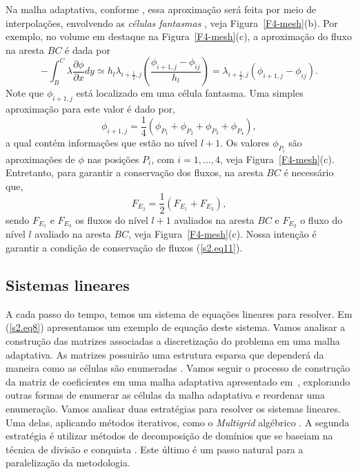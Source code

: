 \documentclass[12pt, brazil]{article}
\begin{document}
Na malha adaptativa, conforme \cite{TRO01}, essa aproximação será feita por meio de interpolações, envolvendo as {\em células fantasmas} \cite{LEV02,TRO01,VER07}, veja Figura~\ref{F4-mesh}(b). Por exemplo, no volume em destaque na Figura~\ref{F4-mesh}(c), a aproximação do fluxo na aresta $BC$ é dada por 
\begin{equation}\label{s2.eq9}
-\int_B^C\lambda\dfrac{\partial\phi}{\partial x}dy \simeq h_l\lambda_{i+\frac{1}{2},j}\left(\dfrac{\phi_{i+1,j}-\phi_{ij}}{h_l}\right)=\lambda_{i+\frac{1}{2},j}(\phi_{i+1,j}-\phi_{ij}).
\end{equation}
Note que $\phi_{i+1,j}$ está localizado em uma célula fantasma. Uma simples aproximação para este valor é dado por,  
\begin{equation}\label{s2.eq10}
\phi_{i+1,j}=\frac{1}{4}(\phi_{P_1}+\phi_{P_2}+\phi_{P_3}+\phi_{P_4}), 
\end{equation}
a qual contém informações que estão no nível $l+1$. Os valores $\phi_{P_i}$ são aproximações de $\phi$ nas posições $P_i$, com $i=1,\ldots,4$, veja Figura~\ref{F4-mesh}(c). Entretanto, para garantir a conservação dos fluxos, na aresta $BC$ é necessário que,
\begin{equation}\label{s2.eq11}
  F_{E_2}=\frac{1}{2}(F_{E_1}+F_{E_3}),
\end{equation}
sendo $F_{E_1}$ e $F_{E_3}$ os fluxos do nível $l+1$ avaliados na aresta $BC$ e $F_{E_2}$ o fluxo do nível $l$ avaliado na aresta $BC$, veja Figura~\ref{F4-mesh}(c). Nossa intenção é garantir a condição de conservação de fluxos (\ref{s2.eq11}).

\subsection{Sistemas lineares}

A cada passo do tempo, temos um sistema de equações lineares para resolver. Em (\ref{s2.eq8}) apresentamos um exemplo de equação deste sistema. Vamos analisar a construção das matrizes associadas a discretização do problema em uma malha adaptativa. As matrizes possuirão uma estrutura esparsa que dependerá da maneira como as células são enumeradas \cite{SAA03}. Vamos seguir o processo de construção  da matriz de coeficientes em uma malha adaptativa apresentado em~\cite{ALV13}, explorando outras formas de enumerar as células da malha adaptativa e reordenar uma enumeração. Vamos analisar duas estratégias para resolver os sistemas lineares. Uma delas, aplicando métodos iterativos, como o {\it Multigrid} algébrico \cite{TRO01}. A segunda estratégia é utilizar métodos de decomposição de domínios que se baseiam na técnica de divisão e conquista \cite{SAA03}. Este último é um passo natural para a paralelização da metodologia.
\end{document}
